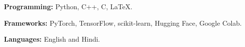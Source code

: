 \textbf{Programming:} Python, C++, C, LaTeX.\par
\textbf{Frameworks:} PyTorch, TensorFlow, scikit-learn, Hugging Face, Google Colab.\par
\textbf{Languages:} English and Hindi.
